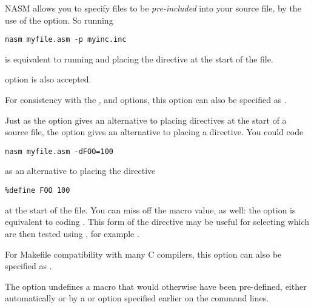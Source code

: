 
NASM allows you to specify files to be \emph{pre-included} into
your source file, by the use of the  option. So running

\begin{lstlisting}
nasm myfile.asm -p myinc.inc
\end{lstlisting}

is equivalent to running  and placing the
directive  at the start of the file.

 option is also accepted.

For consistency with the ,  and  options,
this option can also be specified as .


Just as the  option gives an alternative to placing
 directives at the start of a source file, the 
option gives an alternative to placing a  directive. You
could code

\begin{lstlisting}
nasm myfile.asm -dFOO=100
\end{lstlisting}

as an alternative to placing the directive

\begin{lstlisting}
%define FOO 100
\end{lstlisting}

at the start of the file. You can miss off the macro value, as well:
the option  is equivalent to coding .
This form of the directive may be useful for selecting  which are then tested using , for example .

For Makefile compatibility with many C compilers, this option can also
be specified as .


The  option undefines a macro that would otherwise
have been pre-defined, either automatically or by a  or 
option specified earlier on the command lines.


